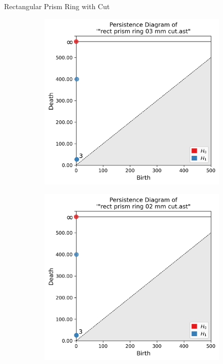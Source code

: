 \documentclass[xcolor=dvipsnames, aspectratio=169]{beamer}
\begin{document}
\begin{frame}{Rectangular Prism Ring with Cut}
\begin{figure}
\begin{subfigure}[b]{0.15\textwidth}
\end{subfigure}
\begin{subfigure}[b]{0.15\textwidth}
\includegraphics[width=\linewidth]{Final Run, (rect prism ring 03 mm cut) persdia.png}
\end{subfigure}
\begin{subfigure}[b]{0.15\textwidth}
\includegraphics[width=\linewidth]{Final Run, (rect prism ring 02 mm cut) persdia.png}

\end{subfigure}
\end{figure}
\end{frame}
\end{document}
